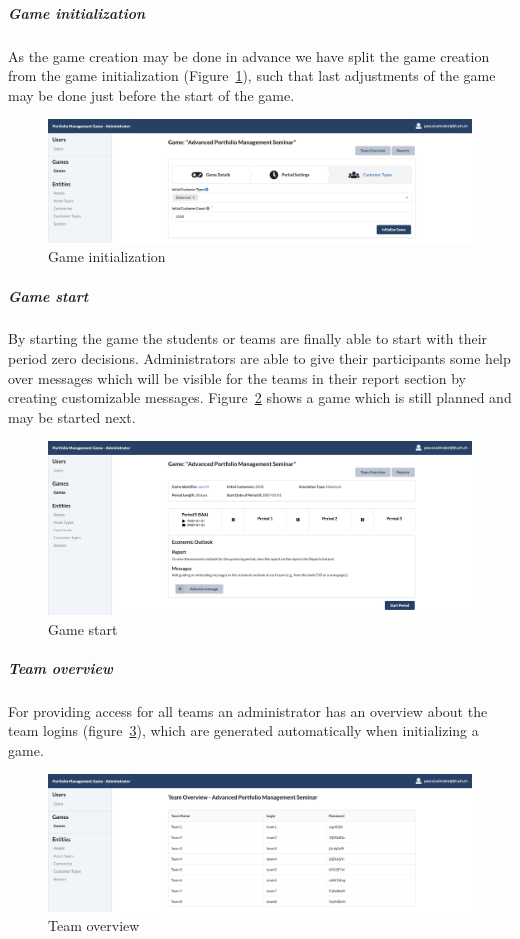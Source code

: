 \subparagraph{Game initialization}
As the game creation may be done in advance we have split the game creation from the game initialization (Figure~\ref{fig:game_initialization}), such that last adjustments of the game may be done just before the start of the game.
\begin{figure}[h!]
  \centering
  \includegraphics[scale=0.2]{img/application-overview/administrator/04_game_initialization.png}
  \caption{Game initialization}
  \label{fig:game_initialization}
\end{figure}

\subparagraph{Game start}
By starting the game the students or teams are finally able to start with their period zero decisions. Administrators are able to give their participants some help over messages which will be visible for the teams in their report section by creating customizable messages. Figure~\ref{fig:game_start} shows a game which is still planned and may be started next.
\begin{figure}[h!]
  \centering
  \includegraphics[scale=0.2]{img/application-overview/administrator/05_game_start.png}
  \caption{Game start}
  \label{fig:game_start}
\end{figure}


\subparagraph{Team overview}
\label{subparagraph:team_overview}
For providing access for all teams an administrator has an overview about the team logins (figure~\ref{fig:team_overview}), which are generated automatically when initializing a game.
\begin{figure}[h!]
  \centering
  \includegraphics[scale=0.2]{img/application-overview/administrator/06_team_login_overview.png}
  \caption{Team overview}
  \label{fig:team_overview}
\end{figure}

